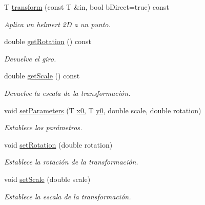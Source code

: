 \begin{DoxyCompactItemize}
T \hyperlink{group__trf2_d_group_gaa9495c4b5fe0dbfb703a2004b41e310b}{transform} (const T \&in, bool b\+Direct=true) const 
\begin{DoxyCompactList}\small\item\em Aplica un helmert 2D a un punto. \end{DoxyCompactList}\item 
double \hyperlink{class_i3_d_1_1_helmert2_d_a7f96184b77dfd19734906e8ea79ec74f}{get\+Rotation} () const 
\begin{DoxyCompactList}\small\item\em Devuelve el giro. \end{DoxyCompactList}\item 
double \hyperlink{class_i3_d_1_1_helmert2_d_ad748a42c6267e30b8dc009714cc07559}{get\+Scale} () const 
\begin{DoxyCompactList}\small\item\em Devuelve la escala de la transformación. \end{DoxyCompactList}\item 
void \hyperlink{group__trf2_d_group_ga792554ed5f33a824b0c619e156697022}{set\+Parameters} (T \hyperlink{class_i3_d_1_1_helmert2_d_ad0bb6ad335ff383cf85f29a3da60c2e7}{x0}, T \hyperlink{class_i3_d_1_1_helmert2_d_a60ddf8a70434410bc53e610abf583dbe}{y0}, double scale, double rotation)
\begin{DoxyCompactList}\small\item\em Establece los parámetros. \end{DoxyCompactList}\item 
void \hyperlink{group__trf2_d_group_gaf7d2a6c0aeeb81c66b8e07e55236a6d2}{set\+Rotation} (double rotation)
\begin{DoxyCompactList}\small\item\em Establece la rotación de la transformación. \end{DoxyCompactList}\item 
void \hyperlink{group__trf2_d_group_gaa732c2f1d68f41b1ab4ca63aa40b21df}{set\+Scale} (double scale)
\begin{DoxyCompactList}\small\item\em Establece la escala de la transformación. \end{DoxyCompactList}\end{DoxyCompactItemize}
